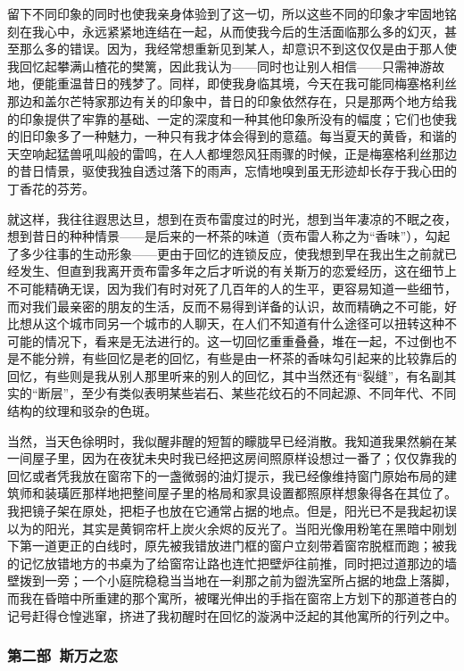 留下不同印象的同时也使我亲身体验到了这一切，所以这些不同的印象才牢固地铭刻在我心中，永远紧紧地连结在一起，从而使我今后的生活面临那么多的幻灭，甚至那么多的错误。因为，我经常想重新见到某人，却意识不到这仅仅是由于那人使我回忆起攀满山楂花的樊篱，因此我认为——同时也让别人相信——只需神游故地，便能重温昔日的残梦了。同样，即使我身临其境，今天在我可能同梅塞格利丝那边和盖尔芒特家那边有关的印象中，昔日的印象依然存在，只是那两个地方给我的印象提供了牢靠的基础、一定的深度和一种其他印象所没有的幅度；它们也使我的旧印象多了一种魅力，一种只有我才体会得到的意蕴。每当夏天的黄昏，和谐的天空响起猛兽吼叫般的雷鸣，在人人都埋怨风狂雨骤的时候，正是梅塞格利丝那边的昔日情景，驱使我独自透过落下的雨声，忘情地嗅到虽无形迹却长存于我心田的丁香花的芬芳。
\par 就这样，我往往遐思达旦，想到在贡布雷度过的时光，想到当年凄凉的不眠之夜，想到昔日的种种情景——是后来的一杯茶的味道（贡布雷人称之为“香味”），勾起了多少往事的生动形象——更由于回忆的连锁反应，使我想到早在我出生之前就已经发生、但直到我离开贡布雷多年之后才听说的有关斯万的恋爱经历，这在细节上不可能精确无误，因为我们有时对死了几百年的人的生平，更容易知道一些细节，而对我们最亲密的朋友的生活，反而不易得到详备的认识，故而精确之不可能，好比想从这个城市同另一个城市的人聊天，在人们不知道有什么途径可以扭转这种不可能的情况下，看来是无法进行的。这一切回忆重重叠叠，堆在一起，不过倒也不是不能分辨，有些回忆是老的回忆，有些是由一杯茶的香味勾引起来的比较靠后的回忆，有些则是我从别人那里听来的别人的回忆，其中当然还有“裂缝”，有名副其实的“断层”，至少有类似表明某些岩石、某些花纹石的不同起源、不同年代、不同结构的纹理和驳杂的色斑。
\par 当然，当天色徐明时，我似醒非醒的短暂的矇胧早已经消散。我知道我果然躺在某一间屋子里，因为在夜犹未央时我已经把这房间照原样设想过一番了；仅仅靠我的回忆或者凭我放在窗帘下的一盏微弱的油灯提示，我已经像维持窗门原始布局的建筑师和装璜匠那样地把整间屋子里的格局和家具设置都照原样想象得各在其位了。我把镜子架在原处，把柜子也放在它通常占据的地点。但是，阳光已不是我起初误以为的阳光，其实是黄铜帘杆上炭火余烬的反光了。当阳光像用粉笔在黑暗中刚划下第一道更正的白线时，原先被我错放进门框的窗户立刻带着窗帘脱框而跑；被我的记忆放错地方的书桌为了给窗帘让路也连忙把壁炉往前推，同时把过道那边的墙壁拨到一旁；一个小庭院稳稳当当地在一刹那之前为盥洗室所占据的地盘上落脚，而我在昏暗中所重建的那个寓所，被曙光伸出的手指在窗帘上方划下的那道苍白的记号赶得仓惶逃窜，挤进了我初醒时在回忆的漩涡中泛起的其他寓所的行列之中。

\subsubsection*{第二部\ 斯万之恋}


